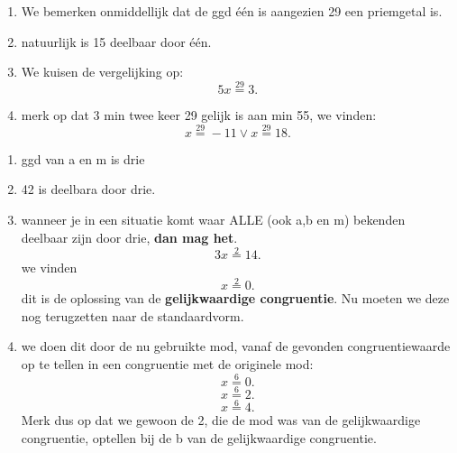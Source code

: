 \documentclass{report}
\begin{document}
\begin{enumerate}
	\item We bemerken onmiddellijk dat de ggd één is aangezien 29 een priemgetal is.

	\item natuurlijk is 15 deelbaar door één.
	\item We kuisen de vergelijking op:
\[
5x \overset{29}{=} 3
.\] 
\item merk op dat 3 min twee keer 29 gelijk is aan min 55, we vinden:
	\[
	x \overset{29}{=} -11 \vee x \overset{29}{=} 18
	.\] 
\end{enumerate}

\begin{enumerate}
	\item ggd van a en m is drie
	\item 42 is deelbara door drie.
	\item  wanneer je in een situatie komt waar ALLE (ook a,b en m) bekenden deelbaar zijn door drie, \textbf{dan mag het}.
		\[
		3x \overset{2}{=} 14
		.\] 
		we vinden
		\[
		x \overset{2}{=} 0
		.\] 
		dit is de oplossing van de \textbf{gelijkwaardige congruentie}. Nu moeten we deze nog terugzetten naar de standaardvorm.
	\item we doen dit door de nu gebruikte mod, vanaf de gevonden congruentiewaarde op te tellen in een congruentie met de originele mod:
		\[
		x \overset{6}{=} 0
		.\] 
		\[
		x \overset{6}{=} 2
		.\] 
		\[
		x \overset{6}{=} 4
		.\] 
		Merk dus op dat we gewoon de 2, die de mod was van de gelijkwaardige congruentie, optellen bij de b van de gelijkwaardige congruentie.
\end{enumerate}


\end{document}
